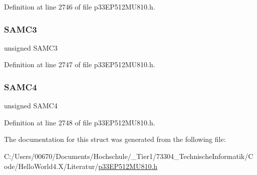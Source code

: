 Definition at line 2746 of file p33\+E\+P512\+M\+U810.\+h.

\mbox{\label{structtag_a_d2_c_o_n3_b_i_t_s_a15086a4b474d7cfc569c16b62b95a82d}} 
\subsubsection{\texorpdfstring{S\+A\+M\+C3}{SAMC3}}
{\footnotesize\ttfamily unsigned S\+A\+M\+C3}



Definition at line 2747 of file p33\+E\+P512\+M\+U810.\+h.

\mbox{\label{structtag_a_d2_c_o_n3_b_i_t_s_a3bc46ad0a1f495c6419955fb68aafe49}} 
\subsubsection{\texorpdfstring{S\+A\+M\+C4}{SAMC4}}
{\footnotesize\ttfamily unsigned S\+A\+M\+C4}



Definition at line 2748 of file p33\+E\+P512\+M\+U810.\+h.



The documentation for this struct was generated from the following file\+:\begin{DoxyCompactItemize}
\item 
C\+:/\+Users/00670/\+Documents/\+Hochschule/\+\_\+\+Tier1/73304\+\_\+\+Technische\+Informatik/\+Code/\+Hello\+World4.\+X/\+Literatur/\hyperlink{p33_e_p512_m_u810_8h}{p33\+E\+P512\+M\+U810.\+h}\end{DoxyCompactItemize}
